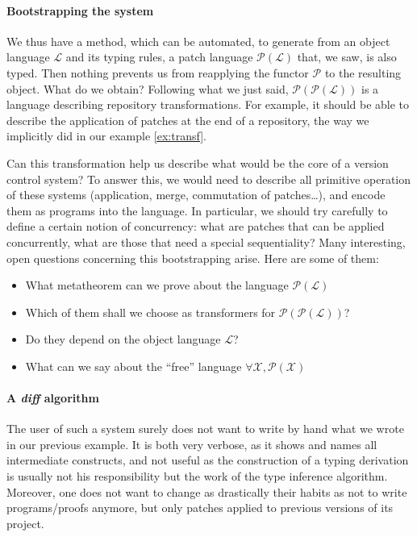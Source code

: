 \documentclass[twoside,a4paper,12pt]{article}
\begin{document}
\paragraph{Bootstrapping the system}

We thus have a method, which can be automated, to generate from an
object language $\mathcal L$ and its typing rules, a patch language
$\mathcal P(\mathcal L)$ that, we saw, is also typed. Then nothing
prevents us from reapplying the functor $\mathcal P$ to the resulting
object. What do we obtain? Following what we just said, $\mathcal
P(\mathcal P(\mathcal L))$ is a language describing repository
transformations. For example, it should be able to describe the
application of patches at the end of a repository, the way we
implicitly did in our example \ref{ex:transf}.

Can this transformation help us describe what would be the core of a
version control system? To answer this, we would need to describe all
primitive operation of these systems (application, merge, commutation
of patches\ldots), and encode them as programs into the language. In
particular, we should try carefully to define a certain notion of
concurrency: what are patches that can be applied concurrently, what
are those that need a special sequentiality? Many interesting, open
questions concerning this bootstrapping arise.  Here are some of them:

\begin{itemize}
\item What metatheorem can we prove about the language $\mathcal
  P(\mathcal L)$
\item Which of them shall we choose as transformers for $\mathcal
  P(\mathcal P(\mathcal L))$?
\item Do they depend on the object language $\mathcal L$?
\item What can we say about the ``free'' language $\forall \mathcal X,
  \mathcal P(\mathcal X)$
\end{itemize}

\paragraph{A \emph{diff} algorithm}

The user of such a system surely does not want to write by hand what
we wrote in our previous example. It is both very verbose, as it shows
and names all intermediate constructs, and not useful as the
construction of a typing derivation is usually not his responsibility
but the work of the type inference algorithm. Moreover, one does not
want to change as drastically their habits as not to write
programs/proofs anymore, but only patches applied to previous versions
of its project.
\end{document}
